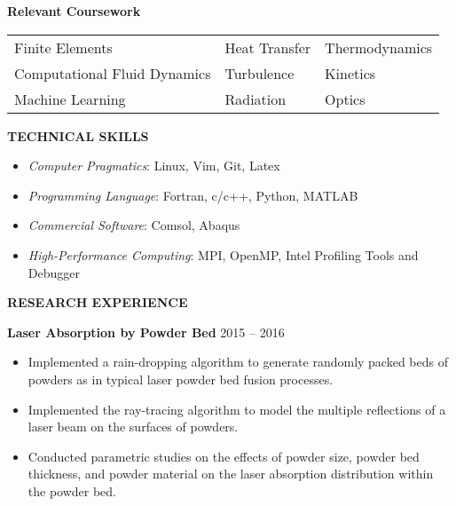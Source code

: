\documentclass[11pt, letterpaper]{article}
\begin{document}
\textbf{Relevant Coursework}

\vspace{6pt}

\begin{tabular}{@{} p{} p{} p{} @{}}
   Finite Elements & Heat Transfer & Thermodynamics \\
   Computational Fluid Dynamics & Turbulence & Kinetics \\
   Machine Learning & Radiation & Optics
\end{tabular}
\vspace{9pt}

\textbf{TECHNICAL SKILLS}

\fullrule

\begin{itemize}[leftmargin=*, labelsep=3mm, itemsep=2pt, topsep=0pt]
   \item \textit{Computer Pragmatics}: Linux, Vim, Git, Latex
   \item \textit{Programming Language}: Fortran, c/c++, Python, MATLAB
   \item \textit{Commercial Software}: Comsol, Abaqus
   \item \textit{High-Performance Computing}: MPI, OpenMP, Intel Profiling Tools and Debugger
\end{itemize}

\vspace{9pt}

% 


\textbf{RESEARCH EXPERIENCE}

\fullrule

\textbf{Laser Absorption by Powder Bed} \hfill 2015 -- 2016
\begin{itemize}[leftmargin=*, labelsep=5mm]
   \item Implemented a rain-dropping algorithm to generate randomly packed beds of powders as in
      typical laser powder bed fusion processes.
   \item Implemented the ray-tracing algorithm to model the multiple reflections of a laser beam on
      the surfaces of powders.
   \item Conducted parametric studies on the effects of powder size, powder bed thickness, and powder
      material on the laser absorption distribution within the powder bed.
\end{itemize}
\end{document}
